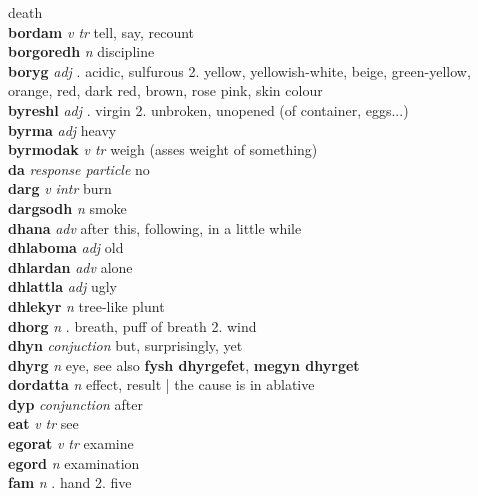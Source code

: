 \textperiodcentered death\\\textbf{bordam}   \emph{v tr} \textperiodcentered tell, say, recount\\\textbf{borgoredh}   \emph{n} \textperiodcentered discipline\\\textbf{boryg}   \emph{adj} . acidic, sulfurous 2. yellow, yellowish-white, beige, green-yellow, orange, red, dark red, brown, rose pink, skin colour \\\textbf{byreshl}   \emph{adj} . virgin 2. unbroken, unopened (of container, eggs...) \\\textbf{byrma}   \emph{adj} \textperiodcentered heavy\\\textbf{byrmodak}   \emph{v tr} \textperiodcentered weigh (asses weight of something)\\\textbf{da}   \emph{response particle} \textperiodcentered no\\\textbf{darg}   \emph{v intr} \textperiodcentered burn\\\textbf{dargsodh}   \emph{n} \textperiodcentered smoke\\\textbf{dhana}   \emph{adv} \textperiodcentered after this, following, in a little while\\\textbf{dhlaboma}   \emph{adj} \textperiodcentered old\\\textbf{dhlardan}   \emph{adv} \textperiodcentered alone\\\textbf{dhlattla}   \emph{adj} \textperiodcentered ugly\\\textbf{dhlekyr}   \emph{n} \textperiodcentered tree-like plunt\\\textbf{dhorg}   \emph{n} . breath, puff of breath 2. wind \\\textbf{dhyn}   \emph{conjuction} \textperiodcentered but, surprisingly, yet\\\textbf{dhyrg}   \emph{n} \textperiodcentered eye, see also \textbf{fysh dhyrgefet}, \textbf{megyn dhyrget}\\\textbf{dordatta}   \emph{n} \textperiodcentered effect, result | the cause is in ablative\\\textbf{dyp}   \emph{conjunction} \textperiodcentered after\\\textbf{eat}   \emph{v tr} \textperiodcentered see\\\textbf{egorat}   \emph{v tr} \textperiodcentered examine\\\textbf{egord}   \emph{n} \textperiodcentered examination\\\textbf{fam}   \emph{n} . hand 2. five 